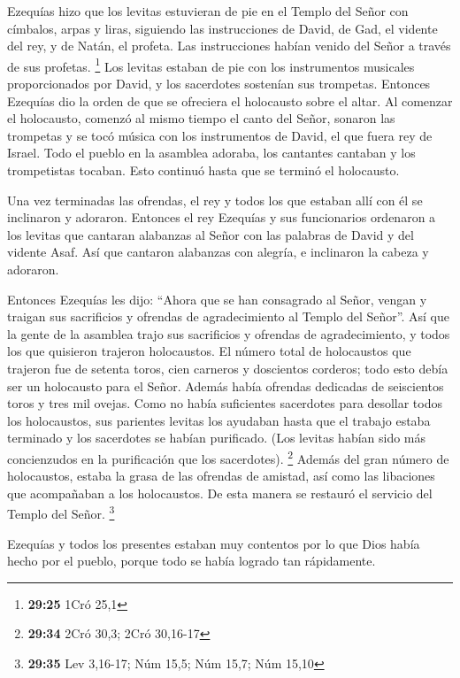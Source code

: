  Ezequías hizo que los levitas estuvieran de pie en el
Templo del Señor con címbalos, arpas y liras, siguiendo las
instrucciones de David, de Gad, el vidente del rey, y de Natán, el
profeta. Las instrucciones habían venido del Señor a través de sus
profetas. \footnote{\textbf{29:25} 1Cró 25,1}  Los
levitas estaban de pie con los instrumentos musicales proporcionados por
David, y los sacerdotes sostenían sus trompetas. 
Entonces Ezequías dio la orden de que se ofreciera el holocausto sobre
el altar. Al comenzar el holocausto, comenzó al mismo tiempo el canto
del Señor, sonaron las trompetas y se tocó música con los instrumentos
de David, el que fuera rey de Israel.  Todo el pueblo en
la asamblea adoraba, los cantantes cantaban y los trompetistas tocaban.
Esto continuó hasta que se terminó el holocausto.

 Una vez terminadas las ofrendas, el rey y todos los que
estaban allí con él se inclinaron y adoraron.  Entonces
el rey Ezequías y sus funcionarios ordenaron a los levitas que cantaran
alabanzas al Señor con las palabras de David y del vidente Asaf. Así que
cantaron alabanzas con alegría, e inclinaron la cabeza y adoraron.

 Entonces Ezequías les dijo: ``Ahora que se han
consagrado al Señor, vengan y traigan sus sacrificios y ofrendas de
agradecimiento al Templo del Señor''. Así que la gente de la asamblea
trajo sus sacrificios y ofrendas de agradecimiento, y todos los que
quisieron trajeron holocaustos.  El número total de
holocaustos que trajeron fue de setenta toros, cien carneros y
doscientos corderos; todo esto debía ser un holocausto para el Señor.
 Además había ofrendas dedicadas de seiscientos toros y
tres mil ovejas.  Como no había suficientes sacerdotes
para desollar todos los holocaustos, sus parientes levitas los ayudaban
hasta que el trabajo estaba terminado y los sacerdotes se habían
purificado. (Los levitas habían sido más concienzudos en la purificación
que los sacerdotes). \footnote{\textbf{29:34} 2Cró 30,3; 2Cró 30,16-17}
 Además del gran número de holocaustos, estaba la grasa
de las ofrendas de amistad, así como las libaciones que acompañaban a
los holocaustos. De esta manera se restauró el servicio del Templo del
Señor. \footnote{\textbf{29:35} Lev 3,16-17; Núm 15,5; Núm 15,7; Núm
  15,10}

 Ezequías y todos los presentes estaban muy contentos por
lo que Dios había hecho por el pueblo, porque todo se había logrado tan
rápidamente.

